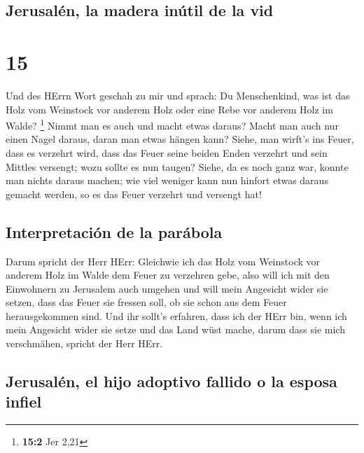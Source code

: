 \hypertarget{jerusaluxe9n-la-madera-inuxfatil-de-la-vid}{%
\subsection{Jerusalén, la madera inútil de la
vid}\label{jerusaluxe9n-la-madera-inuxfatil-de-la-vid}}

\hypertarget{section-14}{%
\section{15}\label{section-14}}

 Und des HErrn Wort geschah zu mir und sprach:
 Du Menschenkind, was ist das Holz vom Weinstock vor
anderem Holz oder eine Rebe vor anderem Holz im Walde? \footnote{\textbf{15:2}
  Jer 2,21}  Nimmt man es auch und macht etwas daraus?
Macht man auch nur einen Nagel daraus, daran man etwas hängen kann?
 Siehe, man wirft's ins Feuer, dass es verzehrt wird, dass
das Feuer seine beiden Enden verzehrt und sein Mittles versengt; wozu
sollte es nun taugen?  Siehe, da es noch ganz war, konnte
man nichts daraus machen; wie viel weniger kann nun hinfort etwas daraus
gemacht werden, so es das Feuer verzehrt und versengt hat!

\hypertarget{interpretaciuxf3n-de-la-paruxe1bola}{%
\subsection{Interpretación de la
parábola}\label{interpretaciuxf3n-de-la-paruxe1bola}}

 Darum spricht der Herr HErr: Gleichwie ich das Holz vom
Weinstock vor anderem Holz im Walde dem Feuer zu verzehren gebe, also
will ich mit den Einwohnern zu Jerusalem auch umgehen  und
will mein Angesicht wider sie setzen, dass das Feuer sie fressen soll,
ob sie schon aus dem Feuer herausgekommen sind. Und ihr sollt's
erfahren, dass ich der HErr bin, wenn ich mein Angesicht wider sie setze
 und das Land wüst mache, darum dass sie mich verschmähen,
spricht der Herr HErr.

\hypertarget{jerusaluxe9n-el-hijo-adoptivo-fallido-o-la-esposa-infiel}{%
\subsection{Jerusalén, el hijo adoptivo fallido o la esposa
infiel}\label{jerusaluxe9n-el-hijo-adoptivo-fallido-o-la-esposa-infiel}}

